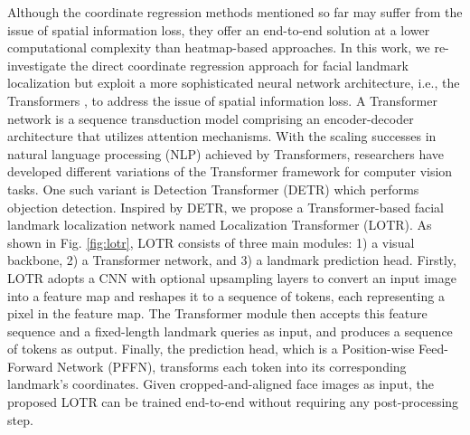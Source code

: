 \documentclass[journal]{IEEEtran}
\begin{document}
Although the coordinate regression methods mentioned so far may suffer from the issue of spatial information loss, they offer an end-to-end solution at a lower computational complexity than heatmap-based approaches. 
In this work, we re-investigate the direct coordinate regression approach for facial landmark localization but exploit a more sophisticated neural network architecture, i.e., the Transformers \cite{Vaswani}, to address the issue of spatial information loss.
A Transformer network is a sequence transduction model comprising an encoder-decoder architecture that utilizes attention mechanisms.
With the scaling successes in natural language processing (NLP) achieved by Transformers, researchers have developed different variations of the Transformer framework for computer vision tasks.
One such variant is Detection Transformer (DETR) \cite{Carion2020} which performs objection detection.
Inspired by DETR, we propose a Transformer-based facial landmark localization network named Localization Transformer (LOTR). 
As shown in Fig. \ref{fig:lotr}, LOTR consists of three main modules: 1) a visual backbone, 2) a Transformer network, and 3) a landmark prediction head. 
Firstly, LOTR adopts a CNN with optional upsampling layers to convert an input image into a feature map and reshapes it to a sequence of tokens, each representing a pixel in the feature map. 
The Transformer module then accepts this feature sequence and a fixed-length landmark queries as input, and produces a sequence of tokens as output.
Finally, the prediction head, which is a Position-wise Feed-Forward Network (PFFN), transforms each token into its corresponding landmark's coordinates. 
Given cropped-and-aligned face images as input, the proposed LOTR can be trained end-to-end without requiring any post-processing step.
\end{document}
